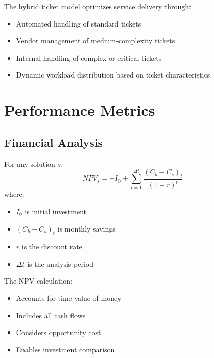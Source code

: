 \documentclass[12pt,a4paper]{article}
\newenvironment{definition}[1]
{\begin{mdframed}[style=definitionstyle,frametitle={Definition: #1}]}
{\end{mdframed}}
\newenvironment{explanation}
{\begin{mdframed}[style=explanationstyle,frametitle={Explanation}]}
{\end{mdframed}}
\begin{document}
\begin{explanation}
The hybrid ticket model optimizes service delivery through:
\begin{itemize}
    \item Automated handling of standard tickets
    \item Vendor management of medium-complexity tickets
    \item Internal handling of complex or critical tickets
    \item Dynamic workload distribution based on ticket characteristics
\end{itemize}
\end{explanation}

\section{Performance Metrics}
\subsection{Financial Analysis}
\begin{definition}{NPV Calculation}
For any solution $s$:
\begin{equation}
    NPV_s = -I_0 + \sum_{t=1}^{\Delta t} \frac{(C_b - C_s)_t}{(1 + r)^t}
\end{equation}
where:
\begin{itemize}
    \item $I_0$ is initial investment
    \item $(C_b - C_s)_t$ is monthly savings
    \item $r$ is the discount rate
    \item $\Delta t$ is the analysis period
\end{itemize}
\end{definition}

\begin{explanation}
The NPV calculation:
\begin{itemize}
    \item Accounts for time value of money
    \item Includes all cash flows
    \item Considers opportunity cost
    \item Enables investment comparison
\end{itemize}
\end{explanation}
\end{document}
